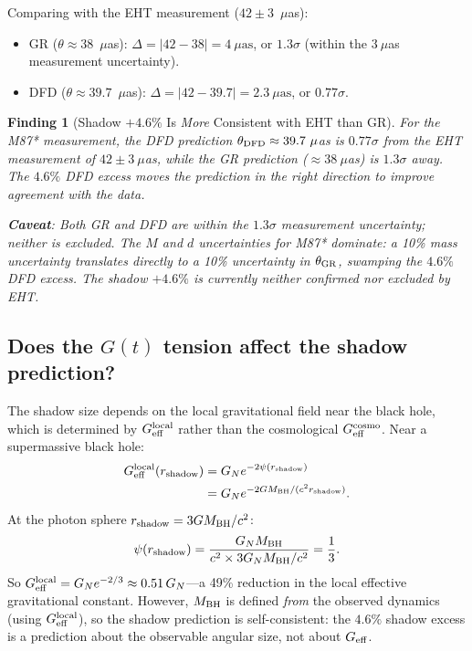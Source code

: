 \documentclass[11pt]{article}
\newtheorem{finding}{Finding}
\begin{document}
Comparing with the EHT measurement ($42 \pm 3$~$\mu$as):
\begin{itemize}
\item GR ($\theta \approx 38$~$\mu$as): $\Delta = |42 - 38| = 4~\mu\text{as}$,
  or $1.3\sigma$ (within the $3~\mu$as measurement uncertainty).
\item DFD ($\theta \approx 39.7$~$\mu$as): $\Delta = |42 - 39.7| = 2.3~\mu\text{as}$,
  or $0.77\sigma$.
\end{itemize}

\begin{finding}[Shadow $+4.6\%$ Is \emph{More} Consistent with EHT than GR]
\label{find:shadow-EHT}
For the M87* measurement, the DFD prediction $\theta_{\rm DFD} \approx 39.7~\mu$as
is $0.77\sigma$ from the EHT measurement of $42 \pm 3~\mu$as, while the
GR prediction ($\approx 38~\mu$as) is $1.3\sigma$ away. The $4.6\%$ DFD excess
moves the prediction in the right direction to improve agreement with the data.

\textbf{Caveat}: Both GR and DFD are within the $1.3\sigma$ measurement uncertainty;
neither is excluded. The $M$ and $d$ uncertainties for M87* dominate: a 10\%
mass uncertainty translates directly to a 10\% uncertainty in $\theta_{\rm GR}$,
swamping the $4.6\%$ DFD excess. The shadow $+4.6\%$ is currently \emph{neither
confirmed nor excluded} by EHT.
\end{finding}

\subsection{Does the $G(t)$ tension affect the shadow prediction?}

The shadow size depends on the local gravitational field near the black hole,
which is determined by $G_{\rm eff}^{\rm local}$ rather than the cosmological
$G_{\rm eff}^{\rm cosmo}$. Near a supermassive black hole:
\begin{align}
G_{\rm eff}^{\rm local}(r_{\rm shadow}) &= G_N e^{-2\psi(r_{\rm shadow})} \notag \\
&= G_N e^{-2GM_{\rm BH}/(c^2 r_{\rm shadow})}.
\end{align}
At the photon sphere $r_{\rm shadow} = 3GM_{\rm BH}/c^2$:
\begin{equation}
\psi(r_{\rm shadow}) = \frac{G_N M_{\rm BH}}{c^2 \times 3G_N M_{\rm BH}/c^2} = \frac{1}{3}.
\end{equation}
So $G_{\rm eff}^{\rm local} = G_N e^{-2/3} \approx 0.51\,G_N$---a 49\% reduction
in the local effective gravitational constant. However, $M_{\rm BH}$ is defined
\emph{from} the observed dynamics (using $G_{\rm eff}^{\rm local}$), so the shadow
prediction is self-consistent: the $4.6\%$ shadow excess is a prediction about
the observable angular size, not about $G_{\rm eff}$.
\end{document}
